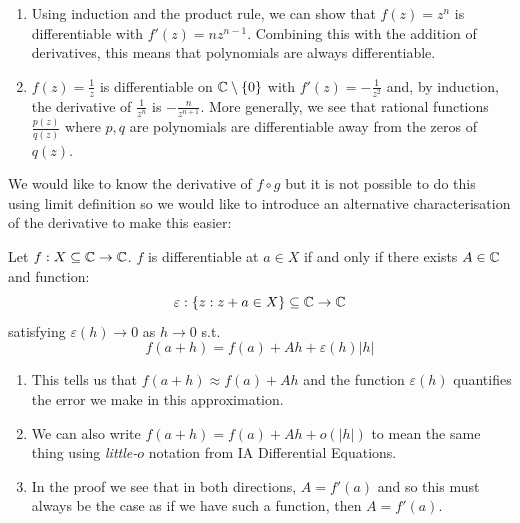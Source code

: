 \documentclass[../main.tex]{subfiles}
\begin{document}
\begin{example}
  \label{powerRule}
  \begin{enumerate}
    \item Using induction and the product rule, we can show that $f(z) = z^{n}$ is differentiable with $f'(z) = nz^{n - 1}$.
      Combining this with the addition of derivatives, this means that polynomials are always differentiable.
    \item $f(z) = \frac{1}{z}$ is differentiable on $\mathbb{C} \setminus \{0\}$ with $f'(z) = - \frac{1}{z^2}$ and, by induction, the derivative of $\frac{1}{z^{n}}$ is $-\frac{n}{z^{n + 1}}$.
      More generally, we see that rational functions $\frac{p(z)}{q(z)}$ where $p, q$ are polynomials are differentiable away from the zeros of $q(z)$.
  \end{enumerate}
\end{example}
We would like to know the derivative of $f \circ g$ but it is not possible to do this using limit definition so we would like to introduce an alternative characterisation of the derivative to make this easier:
\begin{lemma}
  Let $f: X \subseteq \mathbb{C} \to \mathbb{C}$.
  \label{derivativeAlternative}
  $f$ is differentiable at $a \in X$ if and only if there exists $A \in \mathbb{C}$ and function:
  \[
    \varepsilon: \{z: z + a \in X\} \subseteq \mathbb{C} \to \mathbb{C}
  \]
  satisfying $\varepsilon(h) \to 0$ as $h \to 0$ s.t.
  \[
    f(a + h) = f(a) + Ah + \varepsilon(h)|h|
  \]
\end{lemma}
\begin{remark}[Remarks]
  \begin{enumerate}
    \item This tells us that $f(a + h) \approx f(a) + Ah$ and the function $\varepsilon(h)$ quantifies the error we make in this approximation.
    \item We can also write $f(a + h) = f(a) + Ah + o(|h|)$ to mean the same thing using \textit{little-}$o$ notation from IA Differential Equations.
    \item In the proof we see that in both directions, $A = f'(a)$ and so this must always be the case as if we have such a function, then $A = f'(a)$.
  \end{enumerate}
\end{remark}
\end{document}
